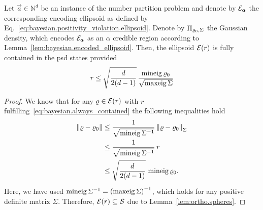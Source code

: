 \begin{lemma}\label{lem:bayesian.always_contained}
  Let $\vec a \in \mathbb{N}^d$ be an instance of the number partition problem and denote by $\mathcal{E}_{{\boldsymbol{a}}}$ the corresponding encoding ellipsoid as defined by Eq.~\eqref{eq:bayesian.positivity_violation.ellipsoid}.
  Denote by $\Pi_{\varrho_0,\Sigma}$ the Gaussian density, which encodes $\mathcal{E}_{{\boldsymbol{a}}}$ as an $\alpha$ credible region according to Lemma~\ref{lem:bayesian.encoded_ellipsoid}.
  Then, the ellipsoid $\mathcal{E}(r)$ is fully contained in the psd states provided
  \[
    \label{eq:bayesian.always_contained}
    r \le \sqrt{\frac{d}{2(d-1)}} \, \frac{\operatorname{mineig}\varrho_0}{\sqrt{\operatorname{maxeig}\Sigma}}
  \]
\end{lemma}
\begin{proof}
  We know that for any $\varrho \in \mathcal{E}(r)$ with $r$ fulfilling~\eqref{eq:bayesian.always_contained} the following inequalities hold
  \begin{align*}
    {\Vert\varrho - \varrho_0\Vert}
    &\le \frac{1}{\sqrt{\operatorname{mineig}\Sigma^{-1}}}\, {\Vert\varrho - \varrho_0\Vert}_\Sigma \\
    &\le \frac{1}{\sqrt{\operatorname{mineig}\Sigma^{-1}}}\, r \\
    &\le \sqrt{\frac{d}{2(d-1)}}\, \operatorname{mineig} \varrho_0.
  \end{align*}
  Here, we have used $\operatorname{mineig}\Sigma^{-1} = {(\operatorname{maxeig} \Sigma)}^{-1}$, which holds for any positive definite matrix $\Sigma$.
  Therefore, $\mathcal{E}(r) \subseteq \mathcal{S}$ due to Lemma~\ref{lem:ortho.spheres}.
\end{proof}


